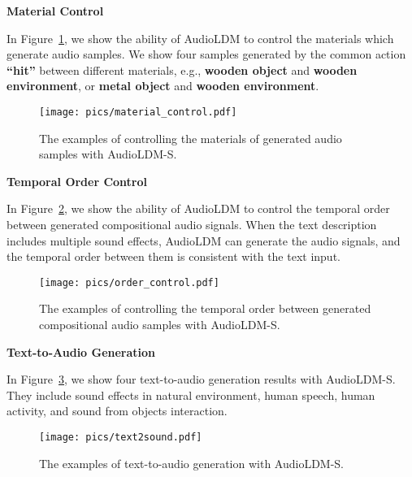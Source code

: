 \documentclass{article}
\begin{document}
\newpage

\textbf{Material Control}

In Figure~\ref{fig:material}, we show the ability of AudioLDM to control the materials which generate audio samples. We show four samples generated by the common action \textbf{``hit''} between different materials, e.g., \textbf{wooden object} and \textbf{wooden environment}, or \textbf{metal object} and \textbf{wooden environment}. 

\vspace{0.5cm}

\begin{figure}[H]
    \centering
    \texttt{[image: pics/material\_control.pdf]}
    \caption{The examples of controlling the materials of generated audio samples with AudioLDM-S.}
    \label{fig:material}
\vspace{0.5cm}
\end{figure}

\vspace{0.5cm}
\textbf{Temporal Order Control}

In Figure~\ref{fig:temporalorder}, we show the ability of AudioLDM to control the temporal order between generated compositional audio signals. When the text description includes multiple sound effects, AudioLDM can generate the audio signals, and the temporal order between them is consistent with the text input.

\begin{figure}[H]
    \centering
    \texttt{[image: pics/order\_control.pdf]}
    \caption{The examples of controlling the temporal order between generated compositional audio samples with AudioLDM-S.}
    \label{fig:temporalorder}
\vspace{0.5cm}
\end{figure}


\textbf{Text-to-Audio Generation}

In Figure~\ref{fig:text-to-audio}, we show four text-to-audio generation results with AudioLDM-S. They include sound effects in natural environment, human speech, human activity, and sound from objects interaction.

\vspace{0.3cm}

\begin{figure}[H]
    \centering
    \texttt{[image: pics/text2sound.pdf]}
    \caption{The examples of text-to-audio generation with AudioLDM-S.}
    \label{fig:text-to-audio}
\vspace{0.6cm}
\end{figure}
\end{document}
